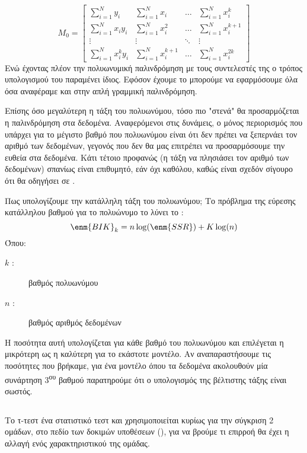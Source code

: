 \\
$$
M_0=
\begin{bmatrix}
    \sum\limits_{i=1}^Ny_i          & \sum\limits_{i=1}^Nx_i        & \dots     & \sum\limits_{i=1}^Nx_i^k \\
    \sum\limits_{i=1}^Nx_iy_i          & \sum\limits_{i=1}^Nx_i^2      & \dots     & \sum\limits_{i=1}^Nx_i^{k+1} \\
    \vdots                          & \vdots                        & \ddots    & \vdots \\
    \sum\limits_{i=1}^Nx_i^ky_i        & \sum\limits_{i=1}^Nx_i^{k+1}  & \dots     & \sum\limits_{i=1}^Nx_i^{2k}
\end{bmatrix}
$$
Ενώ έχοντας πλέον την πολυωνυμική παλινδρόμηση με τους συντελεστές της ο τρόπος
υπολογισμού του  παραμένει ίδιος. Εφόσον έχουμε το  μπορούμε να εφαρμόσουμε
όλα όσα αναφέραμε και στην απλή γραμμική παλινδρόμηση.

Επίσης όσο μεγαλύτερη η τάξη του πολυωνύμου, τόσο πιο "στενά" θα προσαρμόζεται η
παλινδρόμηση στα δεδομένα. Αναφερόμενοι στις δυνάμεις, ο μόνος περιορισμός που
υπάρχει για το μέγιστο βαθμό που πολυωνύμου είναι ότι δεν πρέπει να ξεπερνάει τον αριθμό
των δεδομένων, γεγονός που δεν θα μας επιτρέπει να προσαρμόσουμε την ευθεία στα
δεδομένα. Κάτι τέτοιο προφανώς (η τάξη να πλησιάσει τον αριθμό των δεδομένων) σπανίως
είναι επιθυμητό, εάν όχι καθόλου, καθώς είναι σχεδόν σίγουρο ότι θα οδηγήσει σε .

Πως υπολογίζουμε την κατάλληλη τάξη του πολυωνύμου;
Το πρόβλημα της εύρεσης κατάλληλου βαθμού για το πολυώνυμο το λύνει το :
$$\enm{BIK}_k=n\log (\enm{SSR})+K\log (n)$$
Όπου:
\begin{description}
    \item[$k$ :] βαθμός πολυωνύμου
    \item[$n$ :] βαθμός αριθμός δεδομένων
\end{description}
Η ποσότητα αυτή υπολογίζεται για κάθε βαθμό του πολυωνύμου και επιλέγεται η μικρότερη
ως η καλύτερη για το εκάστοτε μοντέλο. Αν αναπαραστήσουμε τις ποσότητες που
βρήκαμε, για ένα μοντέλο όπου τα δεδομένα ακολουθούν μία συνάρτηση 3\textsuperscript{ου} βαθμού
παρατηρούμε ότι ο υπολογισμός της βέλτιστης τάξης είναι σωστός.
\subsection{}
Το τ-τεστ ένα στατιστικό τεστ και χρησιμοποιείται κυρίως για την σύγκριση 2 ομάδων, στο
πεδίο των δοκιμών υποθέσεων (), για να βρούμε τι επιρροή θα έχει η
αλλαγή ενός χαρακτηριστικού της ομάδας.

